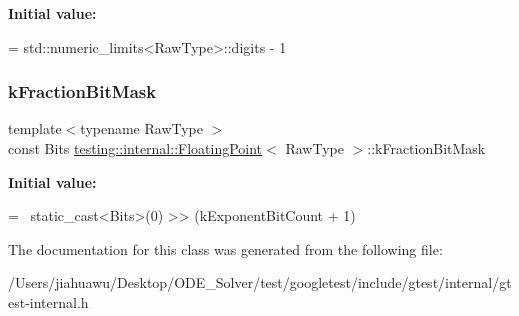 {\bfseries Initial value\+:}
\begin{DoxyCode}
=
    std::numeric\_limits<RawType>::digits - 1
\end{DoxyCode}
\mbox{\label{classtesting_1_1internal_1_1_floating_point_a0ac75d4ffd24f14bca452abe8a718da1}} 
\subsubsection{\texorpdfstring{k\+Fraction\+Bit\+Mask}{kFractionBitMask}}
{\footnotesize\ttfamily template$<$typename Raw\+Type $>$ \\
const Bits \mbox{\hyperlink{classtesting_1_1internal_1_1_floating_point}{testing\+::internal\+::\+Floating\+Point}}$<$ Raw\+Type $>$\+::k\+Fraction\+Bit\+Mask\hspace{0.3cm}{\ttfamily [static]}}

{\bfseries Initial value\+:}
\begin{DoxyCode}
=
    ~static\_cast<Bits>(0) >> (kExponentBitCount + 1)
\end{DoxyCode}


The documentation for this class was generated from the following file\+:\begin{DoxyCompactItemize}
\item 
/\+Users/jiahuawu/\+Desktop/\+O\+D\+E\+\_\+\+Solver/test/googletest/include/gtest/internal/gtest-\/internal.\+h\end{DoxyCompactItemize}
